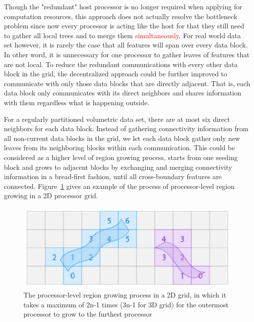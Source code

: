 \documentclass[10pt, conference, compsocconf]{IEEEtran}
\begin{document}
Though the "redundant" host processor is no longer required when applying for computation resources, this approach does not actually resolve the bottleneck problem since now every processor is acting like the host for that they still need to gather all local trees and to merge them \textcolor{red}{simultaneously}. For real world data set however, it is rarely the case that all features will span over every data block. In other word, it is unnecessary for one processor to gather leaves of features that are not local. To reduce the redundant communications with every other data block in the grid, the decentralized approach could be further improved to communicate with only those data blocks that are directly adjacent. That is, each data block only communicates with its direct neighbors and shares information with them regardless what is happening outside.

For a regularly partitioned volumetric data set, there are at most six direct neighbors for each data block. Instead of gathering connectivity information from all non-current data blocks in the grid, we let each data block gather only new leaves from its neighboring blocks within each communication. This could be considered as a higher level of region growing process, starts from one seeding block and grows to adjacent blocks by exchanging and merging connectivity information in a bread-first fashion, until all cross-boundary features are connected. Figure~\ref{fig:grid2d} gives an example of the process of processor-level region growing in a 2D processor grid.

\begin{figure}[ht]
	\centering
	\includegraphics[width=1\linewidth]{grid2d.png}
	\caption{The processor-level region growing process in a 2D grid, in which it takes a maximum of 2n-1 times (3n-1 for 3D grid) for the outermost processor to grow to the furthest processor}
	\label{fig:grid2d}
\end{figure}
\end{document}
